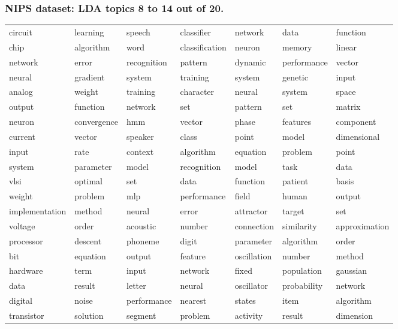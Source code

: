 \begin{frame}
\frametitle{NIPS dataset: LDA topics 8 to 14 out of 20.}

{\scriptsize
\begin{tabular}{l l l l l l l} 
circuit & learning & speech & classifier & network & data & function\\ 
chip & algorithm & word & classification & neuron & memory & linear\\ 
network & error & recognition & pattern & dynamic & performance & vector\\ 
neural & gradient & system & training & system & genetic & input\\ 
analog & weight & training & character & neural & system & space\\ 
output & function & network & set & pattern & set & matrix\\ 
neuron & convergence & hmm & vector & phase & features & component\\ 
current & vector & speaker & class & point & model & dimensional\\ 
input & rate & context & algorithm & equation & problem & point\\ 
system & parameter & model & recognition & model & task & data\\ 
vlsi & optimal & set & data & function & patient & basis\\ 
weight & problem & mlp & performance & field & human & output\\ 
implementation & method & neural & error & attractor & target & set\\ 
voltage & order & acoustic & number & connection & similarity & approximation\\ 
processor & descent & phoneme & digit & parameter & algorithm & order\\ 
bit & equation & output & feature & oscillation & number & method\\ 
hardware & term & input & network & fixed & population & gaussian\\ 
data & result & letter & neural & oscillator & probability & network\\ 
digital & noise & performance & nearest & states & item & algorithm\\ 
transistor & solution & segment & problem & activity & result & dimension
\end{tabular}
}

\end{frame}


